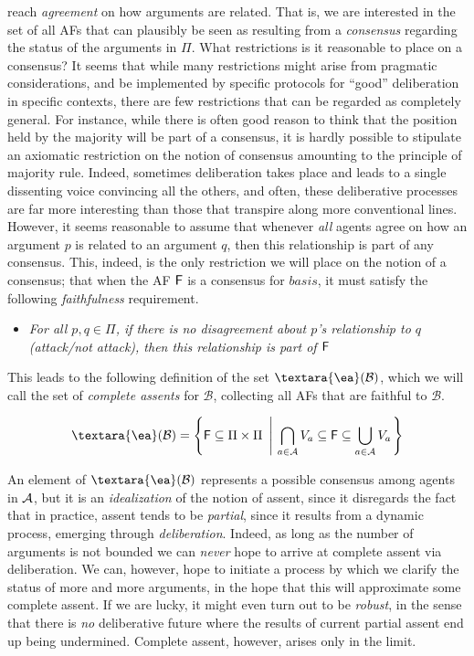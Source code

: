 \documentclass{article}
\newcommand{\cons}[1]{{\textara{\ea}}(#1)}
\newcommand{\af}{{\sf F}}
\newcommand{\basis}{basis }
\newcommand{\views}{\mathcal B}
\begin{document}
 reach \emph{agreement} on how arguments are related. That is, we are interested in the set of all AFs that can plausibly be seen as resulting from a \emph{consensus} regarding the status of the arguments in $\Pi$. What restrictions is it reasonable to place on a consensus? It seems that while many restrictions might arise from pragmatic considerations, and be implemented by specific protocols for ``good'' deliberation in specific contexts, there are few restrictions that can be regarded as completely general. For instance, while there is often good reason to think that the position held by the majority will be part of a consensus, it is hardly possible to stipulate an axiomatic restriction on the notion of consensus amounting to the principle of majority rule. Indeed, sometimes deliberation takes place and leads to a single dissenting voice convincing all the others, and often, these deliberative processes are far more interesting than those that transpire along more conventional lines. However, it seems reasonable to assume that whenever \emph{all} agents agree on how an argument $p$ is related to an argument $q$, then this relationship is part of any consensus. This, indeed, is the only restriction we will place on the notion of a consensus; that when the AF $\af$ is a consensus for $\basis$, it must satisfy the following \emph{faithfulness} requirement.

\begin{itemize}
\item \emph{For all $p,q \in \Pi$, if there is no disagreement about $p$'s relationship to $q$ (attack/not attack), then this relationship is part of $\af$}
\end{itemize}

This leads to the following definition of the set $\cons \views$, which we will call the set of \emph{complete assents} for $\views$, collecting all AFs that are faithful to $\views$.

\begin{equation}\label{def:consensus}
\cons \views = \left\{\af \subseteq \Pi \times \Pi ~\left|~ \bigcap_{a \in \agents}V_a \subseteq \af \subseteq \bigcup_{a \in \agents}V_a\right.\right\}
\end{equation}

An element of $\cons \views$ represents a possible consensus among agents in $\mathcal A$, but it is an \emph{idealization} of the notion of assent, since it disregards the fact that in practice, assent tends to be \emph{partial}, since it results from a dynamic process, emerging through \emph{deliberation}. Indeed, as long as the number of arguments is not bounded we can \emph{never} hope to arrive at complete assent via deliberation. We can, however, hope to initiate a process by which we clarify the status of more and more arguments, in the hope that this will approximate some complete assent. If we are lucky, it might even turn out to be \emph{robust}, in the sense that there is \emph{no} deliberative future where the results of current partial assent end up being undermined. Complete assent, however, arises only in the limit.
\end{document}
